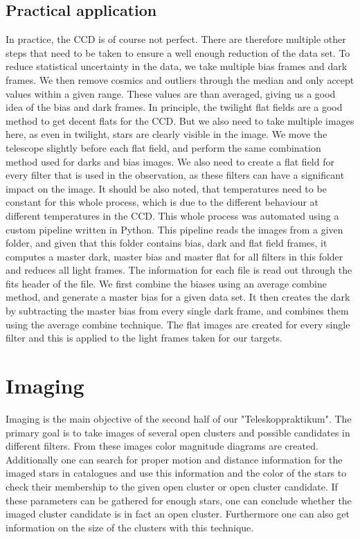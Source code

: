\documentclass{article}
\begin{document}
\subsection{Practical application}
In practice, the CCD is of course not perfect. There are therefore multiple other steps that need to be taken to ensure a well enough reduction of the data set. To reduce statistical uncertainty in the data, we take multiple bias frames and dark frames. We then remove cosmics and outliers through the median and only accept values within a given range. These values are than averaged, giving us a good idea of the bias and dark frames. \newline
In principle, the twilight flat fields are a good method to get decent flats for the CCD. But we also need to take multiple images here, as even in twilight, stars are clearly visible in the image. We move the telescope slightly before each flat field, and perform the same combination method used for darks and bias images. We also need to create a flat field for every filter that is used in the observation, as these filters can have a significant impact on the image. It should be also noted, that temperatures need to be constant for this whole process, which is due to the different behaviour at different temperatures in the CCD.\newline
This whole process was automated using a custom pipeline written in Python. This pipeline reads the images from a given folder, and given that this folder contains bias, dark and flat field frames, it computes a master dark, master bias and master flat for all filters in this folder and reduces all light frames. The information for each file is read out through the fits header of the file. We first combine the biases using an average combine method, and generate a master bias for a given data set. It then creates the dark by subtracting the master bias from every single dark frame, and combines them using the average combine technique. The flat images are created for every single filter and this is applied to the light frames taken for our targets.

\section{Imaging}\label{sec:imaging}

Imaging is the main objective of the second half of our "Teleskoppraktikum". The primary goal is to take images of several open clusters and possible candidates in different filters. From these images color magnitude diagrams are created. Additionally one can search for proper motion and distance information for the imaged stars in catalogues and use this information and the color of the stars to check their membership to the given open cluster or open cluster candidate. If these parameters can be gathered for enough stars, one can conclude whether the imaged cluster candidate is in fact an open cluster. Furthermore one can also get information on the size of the clusters with this technique. 
\end{document}
